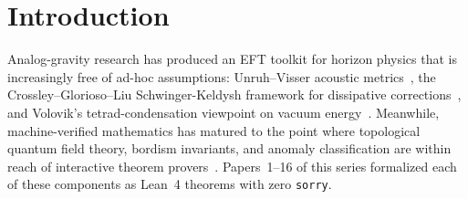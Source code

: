 \documentclass[aps,prd,twocolumn,showpacs,superscriptaddress,nofootinbib]{revtex4-2}
\begin{document}
\begin{abstract}
distinctness from the rationals $w\!\in\!\{-1, 0, 1/3\}$, FG tree-level
CDM obstruction from traceless $T^{\mu\nu}$) and \emph{machine-checked
classifications} (MCC) — the candidate-viability matrix, the
collective-invisibility cap, the two-torsion-channel identification,
and the empirical-hook priority ordering — which encode the deep-
research classifications as a Lean lookup table and verify internal
consistency. (\emph{DarkSectorSynthesis.lean} and \emph{SFDMMergerForecast.lean}
together ship the Phase 5x synthesis; full per-module theorem counts
are machine-maintained in \texttt{docs/counts.tex} and
\S\ref{sec:formal-verification}.) The MCC class is not a physics
derivation; its purpose is to make the Phase 5x classification machine-
auditable and keep the paper's honesty table enforceable. See
\S\ref{sec:formal-verification} and Table~\ref{tab:honesty} for the
MCC--vs--Derived boundary.
\end{abstract}

\maketitle

\section{Introduction}
\label{sec:intro}

Analog-gravity research has produced an EFT toolkit for horizon physics
that is increasingly free of ad-hoc assumptions: Unruh--Visser acoustic
metrics~\cite{Unruh1981,Visser1998}, the Crossley--Glorioso--Liu
Schwinger-Keldysh framework for dissipative corrections~\cite{CGL2017a,CGL2017b},
and Volovik's tetrad-condensation viewpoint on vacuum
energy~\cite{Volovik2006,KV2008}. Meanwhile, machine-verified mathematics
has matured to the point where topological quantum field theory, bordism
invariants, and anomaly classification are within reach of interactive
theorem provers~\cite{Lean4,Mathlib}. Papers~1--16 of this series formalized
each of these components as Lean~4 theorems with zero \texttt{sorry}.
\end{document}
